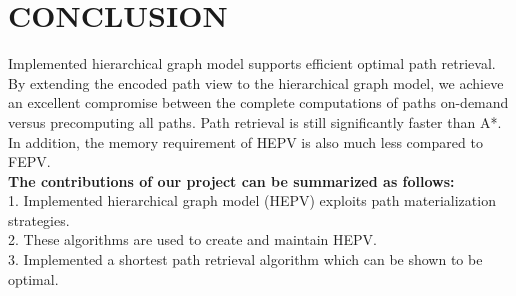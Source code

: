 \chapter{\large CONCLUSION}
\justifying

\hspace*{1cm}Implemented hierarchical graph model supports efficient optimal path retrieval. By extending the encoded path view to the hierarchical graph model, we achieve an excellent compromise between the complete computations of paths on-demand versus precomputing all paths. Path retrieval is still significantly faster than A*. In addition, the memory requirement of HEPV is also much less compared to FEPV.\\

\textbf{The contributions of our project can be summarized as follows:}\\
 \hspace*{1cm}1.	Implemented hierarchical graph model (HEPV) exploits path materialization strategies.\\
 \hspace*{1cm}2.	These algorithms are used to create and maintain HEPV.\\
 \hspace*{1cm}3.	Implemented a shortest path retrieval algorithm which can be shown to be optimal.\\


